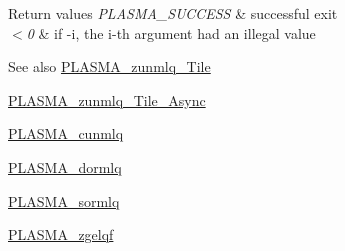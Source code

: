 \begin{DoxyRetVals}{Return values}
{\em P\+L\+A\+S\+M\+A\+\_\+\+S\+U\+C\+C\+E\+S\+S} & successful exit \\
\hline
{\em $<$0} & if -\/i, the i-\/th argument had an illegal value\\
\hline
\end{DoxyRetVals}
\begin{DoxySeeAlso}{See also}
\hyperlink{group__PLASMA__Complex64__t__Tile_gad9b76883d0fe796b0dd8eaadef158d6b_gad9b76883d0fe796b0dd8eaadef158d6b}{P\+L\+A\+S\+M\+A\+\_\+zunmlq\+\_\+\+Tile} 

\hyperlink{group__PLASMA__Complex64__t__Tile__Async_ga5a5533f0e5deb266bd38699d1361e25f_ga5a5533f0e5deb266bd38699d1361e25f}{P\+L\+A\+S\+M\+A\+\_\+zunmlq\+\_\+\+Tile\+\_\+\+Async} 

\hyperlink{group__PLASMA__Complex32__t_gac9aca2d8444a6e5630fe4674505a2afd_gac9aca2d8444a6e5630fe4674505a2afd}{P\+L\+A\+S\+M\+A\+\_\+cunmlq} 

\hyperlink{group__double_ga7c70d5b53e69f9ab564126c78938002a_ga7c70d5b53e69f9ab564126c78938002a}{P\+L\+A\+S\+M\+A\+\_\+dormlq} 

\hyperlink{group__float_ga4f42eb41e34bdf290b36fe5ce8e576b7_ga4f42eb41e34bdf290b36fe5ce8e576b7}{P\+L\+A\+S\+M\+A\+\_\+sormlq} 

\hyperlink{group__PLASMA__Complex64__t_ga8990facf0cb04df2a107c02e5dd5f3f7_ga8990facf0cb04df2a107c02e5dd5f3f7}{P\+L\+A\+S\+M\+A\+\_\+zgelqf} 
\end{DoxySeeAlso}
\hypertarget{group__PLASMA__Complex64__t_ga2a00379e9ae15c89c8a21d7dfa945e8f_ga2a00379e9ae15c89c8a21d7dfa945e8f}{}

